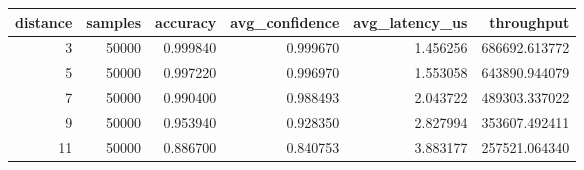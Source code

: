 \begin{tabular}{rrrrrr}
\toprule
distance & samples & accuracy & avg_confidence & avg_latency_us & throughput \\
\midrule
3 & 50000 & 0.999840 & 0.999670 & 1.456256 & 686692.613772 \\
5 & 50000 & 0.997220 & 0.996970 & 1.553058 & 643890.944079 \\
7 & 50000 & 0.990400 & 0.988493 & 2.043722 & 489303.337022 \\
9 & 50000 & 0.953940 & 0.928350 & 2.827994 & 353607.492411 \\
11 & 50000 & 0.886700 & 0.840753 & 3.883177 & 257521.064340 \\
\bottomrule
\end{tabular}
